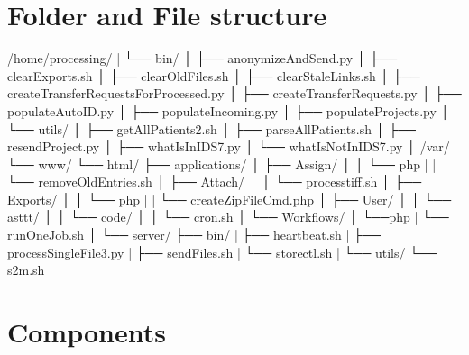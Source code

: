 \documentclass[letterpaper,10pt,english]{sphinxmanual}
\begin{document}
\section{Folder and File structure}
\label{\detokenize{Architecture/index:folder-and-file-structure}}
\begin{sphinxVerbatim}[commandchars=\\\{\}]
/home/processing/
|          └── bin/
│               ├── anonymizeAndSend.py
│               ├── clearExports.sh
│               ├── clearOldFiles.sh
│               ├── clearStaleLinks.sh
│               ├── createTransferRequestsForProcessed.py
│               ├── createTransferRequests.py
│               ├── populateAutoID.py
│               ├── populateIncoming.py
│               ├── populateProjects.py
│               └── utils/
│                      ├── getAllPatients2.sh
│                      ├── parseAllPatients.sh
│                      ├── resendProject.py
│                      ├── whatIsInIDS7.py
│                      └── whatIsNotInIDS7.py
│
/var/
  └── www/
       └── html/
             ├── applications/
             │          ├── Assign/
             │          │     └── php
             |          |          └── removeOldEntries.sh
             │          ├── Attach/
             │          │     └── process\PYGZus{}tiff.sh
             │          ├── Exports/
             │          │     └── php
             |          |          └── createZipFileCmd.php
             │          ├── User/
             │          │     └── asttt/
             │          │            └── code/
             │          │                  └── cron.sh
             │          └── Workflows/
             │                 └──php
             |                    └── runOneJob.sh
             │
             └── server/
                    ├── bin/
                    |    ├── heartbeat.sh
                    |    ├── processSingleFile3.py
                    |    ├── sendFiles.sh
                    |    └── storectl.sh
                    |
                    └── utils/
                          └── s2m.sh
\end{sphinxVerbatim}


\section{Components}
\label{\detokenize{Architecture/index:components}}
\sphinxstepscope
\end{document}
